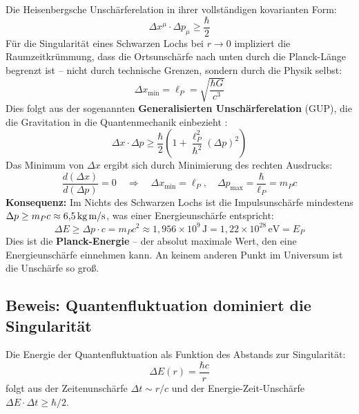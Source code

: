 ﻿\documentclass[12pt,a4paper]{report}
\begin{document}
Die Heisenbergsche Unschärferelation in ihrer vollständigen kovarianten Form:
\begin{equation}
    \Delta x^\mu \cdot \Delta p_\mu \geq \frac{\hbar}{2}
    \label{eq:unschaerfe_kovariant}
\end{equation}
Für die Singularität eines Schwarzen Lochs bei $r \to 0$ impliziert die Raumzeitkrümmung, dass die Ortsunschärfe nach unten durch die Planck-Länge begrenzt ist -- nicht durch technische Grenzen, sondern durch die Physik selbst:
\begin{equation}
    \Delta x_{\min} = \ell_P = \sqrt{\frac{\hbar G}{c^3}}
    \label{eq:min_ortsunschaerfe}
\end{equation}
Dies folgt aus der sogenannten \textbf{Generalisierten Unschärferelation} (GUP), die die Gravitation in die Quantenmechanik einbezieht \cite{veneziano1986,maggiore1993}:
\begin{equation}
    \Delta x \cdot \Delta p \geq \frac{\hbar}{2}\left(1 + \frac{\ell_P^2}{\hbar^2}(\Delta p)^2\right)
    \label{eq:gup}
\end{equation}
Das Minimum von $\Delta x$ ergibt sich durch Minimierung des rechten Ausdrucks:
\begin{equation}
    \frac{d(\Delta x)}{d(\Delta p)} = 0 \quad \Longrightarrow \quad \Delta x_{\min} = \ell_P, \quad \Delta p_{\max} = \frac{\hbar}{\ell_P} = m_P c
    \label{eq:gup_minimum}
\end{equation}
\textbf{Konsequenz:} Im Nichts des Schwarzen Lochs ist die Impulsunschärfe mindestens $\Delta p \geq m_P c \approx 6{,}5\,\text{kg\,m/s}$, was einer Energieunschärfe entspricht:
\begin{equation}
    \Delta E \geq \Delta p \cdot c = m_P c^2 \approx 1{,}956 \times 10^9\,\text{J} = 1{,}22 \times 10^{28}\,\text{eV} = E_P
    \label{eq:planck_energie_unschaerfe}
\end{equation}
Dies ist die \textbf{Planck-Energie} -- der absolut maximale Wert, den eine Energieunschärfe einnehmen kann. An keinem anderen Punkt im Universum ist die Unschärfe so groß.

\subsection{Beweis: Quantenfluktuation dominiert die Singularität}

Die Energie der Quantenfluktuation als Funktion des Abstands zur Singularität:
\begin{equation}
    \Delta E(r) = \frac{\hbar c}{r}
    \label{eq:energiefluktuation}
\end{equation}
folgt aus der Zeitenunschärfe $\Delta t \sim r/c$ und der Energie-Zeit-Unschärfe $\Delta E \cdot \Delta t \geq \hbar/2$.
\end{document}

